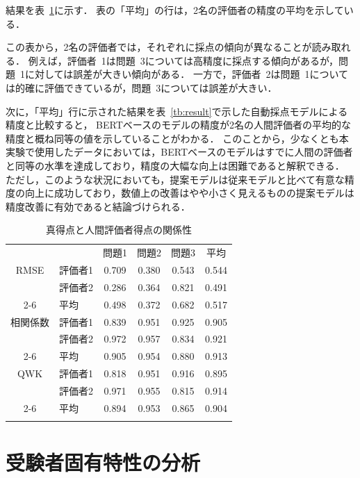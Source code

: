 \documentclass[a4paper,12pt,oneside,openany]{jsbook}
\newcommand{\bhline}[1]{\noalign{\hrule height #1}}
\begin{document}
結果を表~\ref{tb:result2}に示す．
表の「平均」の行は，2名の評価者の精度の平均を示している．

この表から，2名の評価者では，それぞれに採点の傾向が異なることが読み取れる．
例えば，評価者~1は問題~3については高精度に採点する傾向があるが，問題~1に対しては誤差が大きい傾向がある．
一方で，評価者~2は問題~1については的確に評価できているが，問題~3については誤差が大きい．

次に，「平均」行に示された結果を表~\ref{tb:result}で示した自動採点モデルによる精度と比較すると，
BERTベースのモデルの精度が2名の人間評価者の平均的な精度と概ね同等の値を示していることがわかる．
このことから，少なくとも本実験で使用したデータにおいては，BERTベースのモデルはすでに人間の評価者と同等の水準を達成しており，精度の大幅な向上は困難であると解釈できる．
ただし，このような状況においても，提案モデルは従来モデルと比べて有意な精度の向上に成功しており，数値上の改善はやや小さく見えるものの提案モデルは精度改善に有効であると結論づけられる．

\begin{table}[t]
\center
\caption{真得点と人間評価者得点の関係性} \label{tb:result2}
\begin{tabular}{c l cccc}
\bhline{1pt}
& & 問題1 & 問題2 & 問題3 & $平均$ \\
\bhline{1pt}
RMSE& 評価者1& 0.709 & 0.380 & 0.543 & 0.544 \\
& 評価者2 & 0.286 & 0.364 & 0.821 & 0.491 \\
\cline{2-6}
& $平均$ & 0.498 & 0.372 & 0.682 & 0.517 \\
\hline
相関係数& 評価者1& 0.839 & 0.951 & 0.925 & 0.905 \\
& 評価者2& 0.972 & 0.957 & 0.834 & 0.921 \\
\cline{2-6}
& $平均$ & 0.905 & 0.954 & 0.880 & 0.913 \\
\hline
QWK& 評価者1& 0.818 & 0.951 & 0.916 & 0.895 \\
& 評価者2& 0.971 & 0.955 & 0.815 & 0.914 \\
\cline{2-6}
& $平均$ & 0.894 & 0.953 & 0.865 & 0.904 \\
\bhline{1pt}
\end{tabular}
\end{table}

\section{受験者固有特性の分析}
\end{document}
